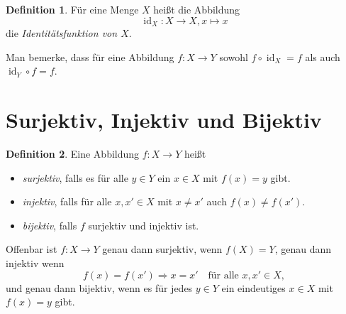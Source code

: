 \documentclass[a4paper,10pt]{article}
\theoremstyle{definition}
\newtheorem*{defi}{Definition}
\DeclareMathOperator{\id}{id}
\begin{document}
\begin{defi}
 Für eine Menge $X$ heißt die Abbildung
 \[
  \id_X \colon X \to X, x \mapsto x
 \]
 die \emph{Identitätsfunktion von $X$}.
\end{defi}

Man bemerke, dass für eine Abbildung $f \colon X \to Y$ sowohl $f \circ \id_X = f$ als auch $\id_Y \circ f = f$.





\section{Surjektiv, Injektiv und Bijektiv}

\begin{defi}
 Eine Abbildung $f \colon X \to Y$ heißt
 \begin{itemize}
  \item
   \emph{surjektiv}, falls es für alle $y \in Y$ ein $x \in X$ mit $f(x) = y$ gibt.
  \item
   \emph{injektiv}, falls für alle $x, x' \in X$ mit $x \neq x'$ auch $f(x) \neq f(x')$.
  \item
   \emph{bijektiv}, falls $f$ surjektiv und injektiv ist.
 \end{itemize}
\end{defi}

Offenbar ist $f \colon X \to Y$ genau dann surjektiv, wenn $f(X) = Y$, genau dann injektiv wenn
\[
 f(x) = f(x') \Rightarrow x = x' \quad \text{für alle }x, x' \in X,
\]
und genau dann bijektiv, wenn es für jedes $y \in Y$ ein eindeutiges $x \in X$ mit $f(x) = y$ gibt.
\end{document}
